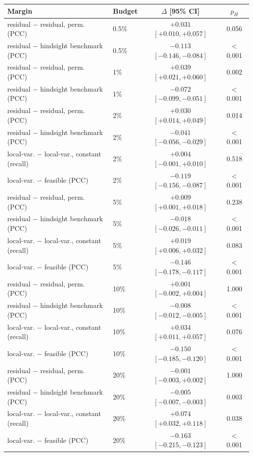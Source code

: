 \begin{tabular}{llcc}
\toprule
Margin & Budget & $\Delta$ [95\% CI] & $p_H$ \\
\midrule
residual $-$ residual, perm. (PCC) & 0.5\% & ${+}0.031$ $[{+}0.010, {+}0.057]$ & 0.056 \\
residual $-$ hindsight benchmark (PCC) & 0.5\% & $-0.113$ $[-0.146, -0.084]$ & $<$0.001 \\
residual $-$ residual, perm. (PCC) & 1\% & ${+}0.039$ $[{+}0.021, {+}0.060]$ & 0.002 \\
residual $-$ hindsight benchmark (PCC) & 1\% & $-0.072$ $[-0.099, -0.051]$ & $<$0.001 \\
residual $-$ residual, perm. (PCC) & 2\% & ${+}0.030$ $[{+}0.014, {+}0.049]$ & 0.014 \\
residual $-$ hindsight benchmark (PCC) & 2\% & $-0.041$ $[-0.056, -0.029]$ & $<$0.001 \\
local-var. $-$ local-var., constant (recall) & 2\% & ${+}0.004$ $[-0.001, {+}0.010]$ & 0.518 \\
local-var. $-$ feasible (PCC) & 2\% & $-0.119$ $[-0.156, -0.087]$ & $<$0.001 \\
residual $-$ residual, perm. (PCC) & 5\% & ${+}0.009$ $[{+}0.001, {+}0.018]$ & 0.238 \\
residual $-$ hindsight benchmark (PCC) & 5\% & $-0.018$ $[-0.026, -0.011]$ & $<$0.001 \\
local-var. $-$ local-var., constant (recall) & 5\% & ${+}0.019$ $[{+}0.006, {+}0.032]$ & 0.083 \\
local-var. $-$ feasible (PCC) & 5\% & $-0.146$ $[-0.178, -0.117]$ & $<$0.001 \\
residual $-$ residual, perm. (PCC) & 10\% & ${+}0.001$ $[-0.002, {+}0.004]$ & 1.000 \\
residual $-$ hindsight benchmark (PCC) & 10\% & $-0.008$ $[-0.012, -0.005]$ & $<$0.001 \\
local-var. $-$ local-var., constant (recall) & 10\% & ${+}0.034$ $[{+}0.011, {+}0.057]$ & 0.076 \\
local-var. $-$ feasible (PCC) & 10\% & $-0.150$ $[-0.185, -0.120]$ & $<$0.001 \\
residual $-$ residual, perm. (PCC) & 20\% & $-0.001$ $[-0.003, {+}0.002]$ & 1.000 \\
residual $-$ hindsight benchmark (PCC) & 20\% & $-0.005$ $[-0.007, -0.003]$ & 0.003 \\
local-var. $-$ local-var., constant (recall) & 20\% & ${+}0.074$ $[{+}0.032, {+}0.118]$ & 0.038 \\
local-var. $-$ feasible (PCC) & 20\% & $-0.163$ $[-0.215, -0.123]$ & $<$0.001 \\
\bottomrule
\end{tabular}